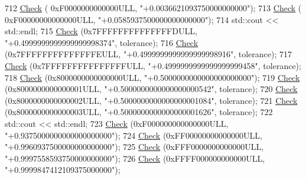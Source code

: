 \begin{DoxyCode}
712   \hyperlink{classns3_1_1int64x64_1_1test_1_1Int64x64Bug1786TestCase_aa4b4b833335ea1266a4f7f5f0e314b5b}{Check} (  0xF0000000000000ULL, \textcolor{stringliteral}{"+0.0036621093750000000000"});
713   \hyperlink{classns3_1_1int64x64_1_1test_1_1Int64x64Bug1786TestCase_aa4b4b833335ea1266a4f7f5f0e314b5b}{Check} ( 0xF00000000000000ULL, \textcolor{stringliteral}{"+0.0585937500000000000000"});
714   std::cout << std::endl;
715   \hyperlink{classns3_1_1int64x64_1_1test_1_1Int64x64Bug1786TestCase_aa4b4b833335ea1266a4f7f5f0e314b5b}{Check} (0x7FFFFFFFFFFFFFFDULL, \textcolor{stringliteral}{"+0.4999999999999999998374"}, tolerance);
716   \hyperlink{classns3_1_1int64x64_1_1test_1_1Int64x64Bug1786TestCase_aa4b4b833335ea1266a4f7f5f0e314b5b}{Check} (0x7FFFFFFFFFFFFFFEULL, \textcolor{stringliteral}{"+0.4999999999999999998916"}, tolerance);
717   \hyperlink{classns3_1_1int64x64_1_1test_1_1Int64x64Bug1786TestCase_aa4b4b833335ea1266a4f7f5f0e314b5b}{Check} (0x7FFFFFFFFFFFFFFFULL, \textcolor{stringliteral}{"+0.4999999999999999999458"}, tolerance);
718   \hyperlink{classns3_1_1int64x64_1_1test_1_1Int64x64Bug1786TestCase_aa4b4b833335ea1266a4f7f5f0e314b5b}{Check} (0x8000000000000000ULL, \textcolor{stringliteral}{"+0.5000000000000000000000"});
719   \hyperlink{classns3_1_1int64x64_1_1test_1_1Int64x64Bug1786TestCase_aa4b4b833335ea1266a4f7f5f0e314b5b}{Check} (0x8000000000000001ULL, \textcolor{stringliteral}{"+0.5000000000000000000542"}, tolerance);
720   \hyperlink{classns3_1_1int64x64_1_1test_1_1Int64x64Bug1786TestCase_aa4b4b833335ea1266a4f7f5f0e314b5b}{Check} (0x8000000000000002ULL, \textcolor{stringliteral}{"+0.5000000000000000001084"}, tolerance);
721   \hyperlink{classns3_1_1int64x64_1_1test_1_1Int64x64Bug1786TestCase_aa4b4b833335ea1266a4f7f5f0e314b5b}{Check} (0x8000000000000003ULL, \textcolor{stringliteral}{"+0.5000000000000000001626"}, tolerance);
722   std::cout << std::endl;
723   \hyperlink{classns3_1_1int64x64_1_1test_1_1Int64x64Bug1786TestCase_aa4b4b833335ea1266a4f7f5f0e314b5b}{Check} (0xF000000000000000ULL, \textcolor{stringliteral}{"+0.9375000000000000000000"});
724   \hyperlink{classns3_1_1int64x64_1_1test_1_1Int64x64Bug1786TestCase_aa4b4b833335ea1266a4f7f5f0e314b5b}{Check} (0xFF00000000000000ULL, \textcolor{stringliteral}{"+0.9960937500000000000000"});
725   \hyperlink{classns3_1_1int64x64_1_1test_1_1Int64x64Bug1786TestCase_aa4b4b833335ea1266a4f7f5f0e314b5b}{Check} (0xFFF0000000000000ULL, \textcolor{stringliteral}{"+0.9997558593750000000000"});
726   \hyperlink{classns3_1_1int64x64_1_1test_1_1Int64x64Bug1786TestCase_aa4b4b833335ea1266a4f7f5f0e314b5b}{Check} (0xFFFF000000000000ULL, \textcolor{stringliteral}{"+0.9999847412109375000000"});

\end{DoxyCode}
